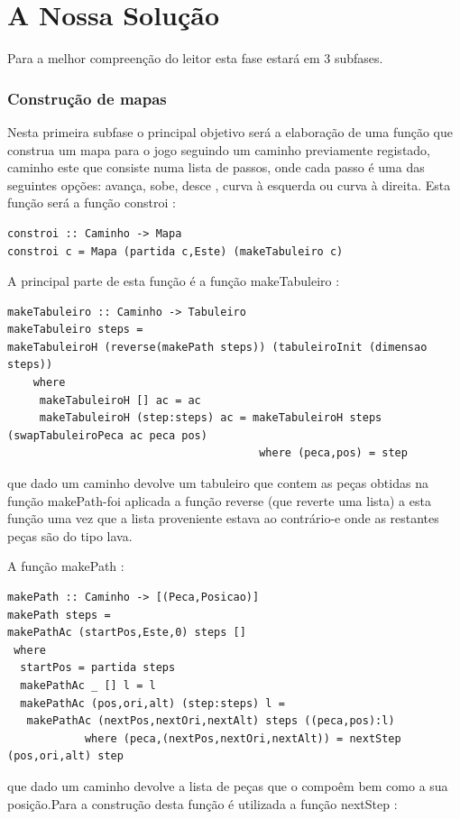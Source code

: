 \documentclass[a4paper]{report} %
\begin{document}
\chapter{A Nossa Solução}

Para a melhor compreenção do leitor esta fase estará em 3 subfases.

\subsection{Construção de mapas}

Nesta primeira subfase o principal objetivo será a elaboração de uma função que construa um mapa para o jogo seguindo um caminho previamente registado, caminho este que consiste numa lista de passos, onde cada passo é
uma das seguintes opções: avança, sobe, desce , curva à esquerda ou curva à direita.
Esta função será a função constroi :

\begin{verbatim}
constroi :: Caminho -> Mapa
constroi c = Mapa (partida c,Este) (makeTabuleiro c)
\end{verbatim}
A principal parte de esta função é a função makeTabuleiro :

\begin{verbatim}
makeTabuleiro :: Caminho -> Tabuleiro
makeTabuleiro steps = 
makeTabuleiroH (reverse(makePath steps)) (tabuleiroInit (dimensao steps))
    where
     makeTabuleiroH [] ac = ac
     makeTabuleiroH (step:steps) ac = makeTabuleiroH steps (swapTabuleiroPeca ac peca pos)
                                       where (peca,pos) = step
\end{verbatim}
que dado um caminho devolve um tabuleiro que contem as peças obtidas na função makePath-foi aplicada a função reverse (que reverte uma lista) a esta função uma vez que a lista proveniente estava ao contrário-e onde as restantes peças são do tipo lava.






A função makePath :

\begin{verbatim}
makePath :: Caminho -> [(Peca,Posicao)]
makePath steps = 
makePathAc (startPos,Este,0) steps []
 where
  startPos = partida steps
  makePathAc _ [] l = l
  makePathAc (pos,ori,alt) (step:steps) l = 
   makePathAc (nextPos,nextOri,nextAlt) steps ((peca,pos):l)
            where (peca,(nextPos,nextOri,nextAlt)) = nextStep (pos,ori,alt) step
\end{verbatim}
que dado um caminho devolve a lista de peças que o compoêm bem como a sua posição.Para a construção desta função é utilizada a função nextStep :
\end{document}
